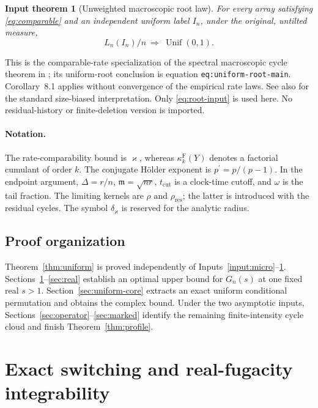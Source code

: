 \documentclass[11pt]{article}
\numberwithin{equation}{section}
\newtheorem{inputtheorem}[theorem]{Input theorem}
\theoremstyle{definition}
\theoremstyle{remark}
\newcommand{\Unif}{\operatorname{Unif}}
\newcommand{\pdual}{{p^{\prime}}}
\newcommand{\mres}{\mathfrak m}
\begin{document}
\begin{inputtheorem}[Unweighted macroscopic root law]\label{input:root}
For every array satisfying \eqref{eq:comparable} and an independent uniform label $I_n$, under the original, untilted measure,
\begin{equation}\label{eq:root-input}
 L_n(I_n)/n\ \Rightarrow\ \Unif(0,1).
\end{equation}
\end{inputtheorem}

This is the comparable-rate specialization of the spectral macroscopic
cycle theorem in \cite[Theorem~1.1 and Corollary~8.1]{LongMacro}; its
uniform-root conclusion is equation \texttt{eq:uniform-root-main}.
Corollary~8.1 applies without convergence of the empirical rate laws.
See also \cite[Chapter 3]{Pitman} for the standard size-biased
interpretation. Only \eqref{eq:root-input} is used here. No residual-history
or finite-deletion version is imported.

\paragraph{Notation.}
The rate-comparability bound is $\varkappa$, whereas
$\kappa_k^{\mathrm F}(Y)$ denotes a factorial cumulant of order $k$.
The conjugate H\"older exponent is $\pdual=p/(p-1)$.
In the endpoint argument, $\Delta=r/n$, $\mres=\sqrt{nr}$,
$t_{\mathrm{cut}}$ is a clock-time cutoff, and $\omega$ is the tail fraction.
The limiting kernels are $\rho$ and $\rho_{\mathrm{res}}$; the latter is
introduced with the residual cycles. The symbol $\delta_{\varkappa}$ is
reserved for the analytic radius.

\subsection{Proof organization}
Theorem~\ref{thm:uniform} is proved independently of Inputs~\ref{input:micro}--\ref{input:root}. Sections~\ref{sec:switch}--\ref{sec:real} establish an optimal upper bound for $G_n(s)$ at one fixed real $s>1$. Section~\ref{sec:uniform-core} extracts an exact uniform conditional permutation and obtains the complex bound. Under the two asymptotic inputs, Sections~\ref{sec:operator}--\ref{sec:marked} identify the remaining finite-intensity cycle cloud and finish Theorem~\ref{thm:profile}.

\section{Exact switching and real-fugacity integrability}\label{sec:switch}
\end{document}
